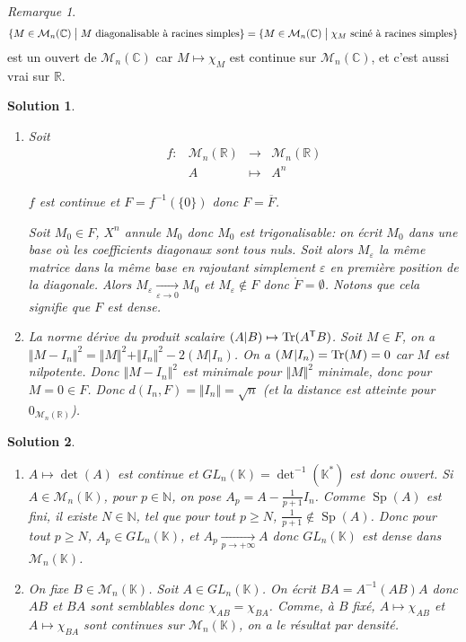 \documentclass[12pt]{article}
\newtheorem{solution}{Solution}[section]
\theoremstyle{remark}
\newtheorem{remark}{Remarque}[section]
\newcommand{\K}{\mathbb{K}} \newcommand{\R}{\mathbb{R}}
\newcommand{\C}{\mathbb{C}} \newcommand{\Q}{\mathbb{Q}}
\newcommand{\N}{\mathbb{N}} \newcommand{\Z}{\mathbb{Z}}
\newcommand{\M}{\mathcal{M}} \renewcommand{\L}{\mathcal{L}}
\DeclareMathOperator{\Sp}{Sp} \DeclareMathOperator{\mat}{mat}
\newcommand{\function}[5]{
	$$
	\begin{array}{rccl}
		#1: & #2 & \to & #3 \\
		& #4 & \mapsto & #5
	\end{array}
	$$
}
\numberwithin{equation}{section}
\begin{document}
\begin{remark}
	$$\{M\in\M_{n}(\C)\bigm|M\text{ diagonalisable à racines simples}\}=\{M\in\M_{n}(\C)\bigm|\chi_M\text{ sciné à racines simples}\}$$
	est un ouvert de $\M_{n}(\C)$ car $M\mapsto\chi_{M}$ est continue sur $\M_{n}(\C)$, et c'est aussi vrai sur $\R$.
\end{remark}

\begin{solution}
	\phantom{}
	\begin{enumerate}
		\item Soit \function{f}{\M_n(\R)}{\M_n(\R)}{A}{A^{n}}
		$f$ est continue et $F=f^{-1}(\{0\})$ donc $F=\overline{F}$.

		Soit $M_{0}\in F$, $X^{n}$ annule $M_{0}$ donc $M_{0}$ est trigonalisable: on écrit $M_{0}$ dans une base où les coefficients diagonaux sont tous nuls. Soit alors $M_{\varepsilon}$ la même matrice dans la même base en rajoutant simplement $\varepsilon$ en première position de la diagonale. Alors $M_{\varepsilon}\xrightarrow[\varepsilon\to0]{}M_{0}$ et $M_{\varepsilon}\notin F$ donc $\mathring{F}=\emptyset$. Notons que cela signifie que $F$ est dense.

		\item La norme dérive du produit scalaire $(A|B)\mapsto\operatorname{Tr}(A^{\mathsf{T}}B)$. Soit $M\in F$, on a $\Vert M-I_{n}\Vert^{2}=\Vert M\Vert^{2}+\Vert I_{n}\Vert^{2}-2(M|I_{n})$. On a $(M|I_{n})=\operatorname{Tr}(M)=0$ car $M$ est nilpotente. Donc $\Vert M-I_{n}\Vert^{2}$ est minimale pour $\Vert M\Vert^{2}$ minimale, donc pour $M=0\in F$. Donc $d(I_{n},F)=\Vert I_{n}\Vert=\sqrt{n}$ (et la distance est atteinte pour $0_{\M_n(\R)}$).
	\end{enumerate}
\end{solution}

\begin{solution}
	\phantom{}
	\begin{enumerate}
		\item $A\mapsto\det(A)$ est continue et $GL_{n}(\K)=\det^{-1}(\K^{*})$ est donc ouvert. Si $A\in\M_{n}(\K)$, pour $p\in\N$, on pose $A_{p}=A-\frac{1}{p+1}I_{n}$. Comme $\Sp(A)$ est fini, il existe $N\in\N$, tel que pour tout $p\geqslant N$, $\frac{1}{p+1}\notin\Sp(A)$. Donc pour tout $p\geqslant N$, $A_{p}\in GL_{n}(\K)$, et $A_{p}\xrightarrow[p\to+\infty]{}A$ donc $GL_{n}(\K)$ est dense dans $\M_{n}(\K)$.
		\item On fixe $B\in\M_{n}(\K)$. Soit $A\in GL_{n}(\K)$. On écrit $BA=A^{-1}(AB)A$ donc $AB$ et $BA$ sont semblables donc $\chi_{AB}=\chi_{BA}$. Comme, à $B$ fixé, $A\mapsto\chi_{AB}$ et $A\mapsto\chi_{BA}$ sont continues sur $\M_{n}(\K)$, on a le résultat par densité.
	\end{enumerate}
\end{solution}
\end{document}
